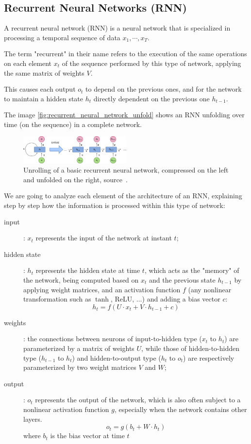 \subsection{Recurrent Neural Networks (RNN)}
A recurrent neural network (RNN) is a neural network that is specialized in processing a temporal sequence of data $x_1, \cdots,x_T$.

The term "recurrent" in their name refers to the execution of the same operations on each element $x_t$ of the sequence performed by this type of network, applying the same matrix of weights $V$.

This causes each output $o_t$ to depend on the previous ones, and for the network to maintain a hidden state $h_t$ directly dependent on the previous one $h_{t-1}$.

The image \vref{fig:recurrent_neural_network_unfold} shows an RNN unfolding over time (on the sequence) in a complete network.

\begin{figure}
	\includegraphics[width=0.5\textwidth]{images/recurrent_neural_network_unfold}
	\caption{Unrolling of a basic recurrent neural network, compressed on the left and unfolded on the right, source~\cite{wiki:rnn}.}
	\label{fig:recurrent_neural_network_unfold}
\end{figure}

We are going to analyze each element of the architecture of an RNN, explaining step by step how the information is processed within this type of network:
\begin{description}
	\item[input]: $x_t$ represents the input of the network at instant $t$;
	\item[hidden state]: $h_t$ represents the hidden state at time $t$, which acts as the "memory" of the network, being computed based on $x_t$ and the previous state $h_{t-1}$ by applying weight matrices, and an activation function $f$ (any nonlinear transformation such as $\tanh$, ReLU, $\dots$) and adding a bias vector $c$:
	$$
	h_{t}=f\left(U \cdot x_{t}+V \cdot h_{t-1}+c\right)
	$$
	\item[weights]: the connections between neurons of input-to-hidden type ($x_t$ to $h_t$) are parameterized by a matrix of weights $U$, while those of hidden-to-hidden type ($h_{t-1}$ to $h_t$) and hidden-to-output type ($h_t$ to $o_t$) are respectively parameterized by two weight matrices $V$ and $W$;
	\item[output]: $o_t$ represents the output of the network, which is also often subject to a nonlinear activation function $g$, especially when the network contains other layers.
	$$
	o_{t}=g\left(b_{t}+W \cdot h_{t}\right)
	$$ 
	where $b_{t}$ is the bias vector at time $t$
\end{description}
